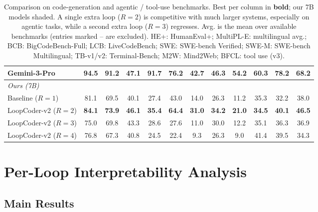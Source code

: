 \documentclass{llmxive}
\providecommand{\loopcount}{R}
\providecommand{\modelname}{LoopCoder-v2}
\begin{document}
\begin{table}[t]
{\begin{tabular}{l ccccccccccc}
Gemini-3-Pro                    & \textbf{94.5} & \textbf{91.2} & 47.1 & \textbf{91.7} & 76.2 & 42.7 & 46.3 & 54.2 & \textbf{60.3} & 78.2 & 68.2 \\
\midrule
\multicolumn{12}{l}{\textit{Ours (7B)}} \\
\rowcolor{tablegray} Baseline ($\loopcount{=}1$)        & 81.1 & 69.5 & 40.1 & 27.4 & 43.0 & 14.0 & 26.3 & 11.2 & 35.3 & 32.2 & 38.0 \\
\rowcolor{tablegray} \modelname{} ($\loopcount{=}2$)    & \textbf{84.1} & \textbf{73.9} & \textbf{46.1} & \textbf{35.4} & \textbf{64.4} & \textbf{31.0} & \textbf{34.2} & \textbf{21.0} & \textbf{34.5} & \textbf{40.1} & \textbf{46.5} \\
\rowcolor{tablegray} \modelname{} ($\loopcount{=}3$)    & 75.0 & 69.8 & 43.3 & 28.6 & 27.6 & 11.0 & 30.0 & 12.2 & 35.1 & 36.3 & 36.9 \\
\rowcolor{tablegray} \modelname{} ($\loopcount{=}4$)    & 76.8 & 67.3 & 40.8 & 24.5 & 22.4 & 9.3 & 26.3 & 9.0 & 41.4 & 39.5 & 34.3 \\
\bottomrule
\end{tabular}}
\caption{Comparison on code-generation and agentic / tool-use benchmarks.
Best per column in \textbf{bold}; our 7B models shaded. A single extra loop
($\loopcount{=}2$) is competitive with much larger systems, especially on
agentic tasks, while a second extra loop ($\loopcount{=}3$) regresses.
Avg. is the mean over available benchmarks (entries marked -- are excluded). HE+: HumanEval+;
MultiPL-E: multilingual avg.; BCB: BigCodeBench-Full;
LCB: LiveCodeBench; SWE: SWE-bench Verified; SWE-M: SWE-bench Multilingual;
TB-v1/v2: Terminal-Bench; M2W: Mind2Web; BFCL: tool use (v3).}
\label{tab:main-comparison}
\end{table}

\section{Per-Loop Interpretability Analysis}
\label{sec:analysis}

\subsection{Main Results}
\label{sec:exp-results}
\end{document}
